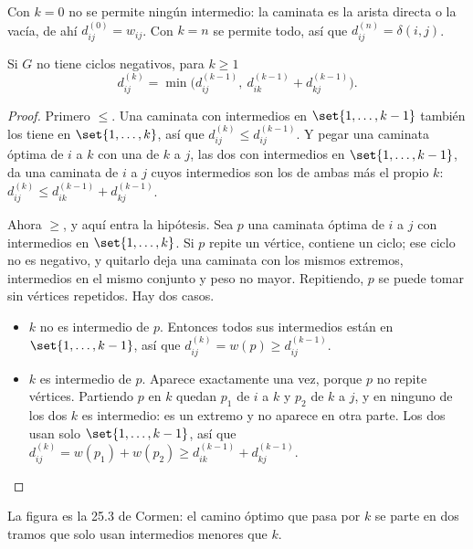 \documentclass[11pt,letterpaper]{article}
\begin{document}
Con $k = 0$ no se permite ningún intermedio: la caminata es la arista
directa o la vacía, de ahí $d^{(0)}_{ij} = w_{ij}$. Con $k = n$ se
permite todo, así que $d^{(n)}_{ij} = \delta(i, j)$.

\begin{lema}
  \label{lem:estructura-floyd}
  Si $G$ no tiene ciclos negativos, para $k \ge 1$
  \[
    d^{(k)}_{ij} = \min\bigl( d^{(k-1)}_{ij},\
                   d^{(k-1)}_{ik} + d^{(k-1)}_{kj} \bigr) .
  \]
\end{lema}

\begin{proof}
  Primero $\le$. Una caminata con intermedios en
  $\set{1, \dots, k - 1}$ también los tiene en $\set{1, \dots, k}$,
  así que $d^{(k)}_{ij} \le d^{(k-1)}_{ij}$. Y pegar una caminata
  óptima de $i$ a $k$ con una de $k$ a $j$, las dos con intermedios en
  $\set{1, \dots, k - 1}$, da una caminata de $i$ a $j$ cuyos
  intermedios son los de ambas más el propio $k$:
  $d^{(k)}_{ij} \le d^{(k-1)}_{ik} + d^{(k-1)}_{kj}$.

  Ahora $\ge$, y aquí entra la hipótesis. Sea $p$ una caminata óptima
  de $i$ a $j$ con intermedios en $\set{1, \dots, k}$. Si $p$ repite
  un vértice, contiene un ciclo; ese ciclo no es negativo, y quitarlo
  deja una caminata con los mismos extremos, intermedios en el mismo
  conjunto y peso no mayor. Repitiendo, $p$ se puede tomar sin
  vértices repetidos. Hay dos casos.
  \begin{itemize}[itemsep=0.1em]
    \item $k$ no es intermedio de $p$. Entonces todos sus intermedios
          están en $\set{1, \dots, k - 1}$, así que
          $d^{(k)}_{ij} = w(p) \ge d^{(k-1)}_{ij}$.
    \item $k$ es intermedio de $p$. Aparece exactamente una vez,
          porque $p$ no repite vértices. Partiendo $p$ en $k$ quedan
          $p_1$ de $i$ a $k$ y $p_2$ de $k$ a $j$, y en ninguno de los
          dos $k$ es intermedio: es un extremo y no aparece en otra
          parte. Los dos usan solo $\set{1, \dots, k - 1}$, así que
          $d^{(k)}_{ij} = w(p_1) + w(p_2)
          \ge d^{(k-1)}_{ik} + d^{(k-1)}_{kj}$. \qedhere
  \end{itemize}
\end{proof}

La figura es la 25.3 de Cormen: el camino óptimo que pasa por $k$ se
parte en dos tramos que solo usan intermedios menores que $k$.
\end{document}
